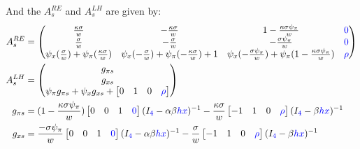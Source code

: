\documentclass[11pt]{article}
\renewcommand{\[}{\begin{equation}}
\renewcommand{\]}{\end{equation}}
\begin{document}
And the $A^{RE}_s$ and $A^{LH}_s$ are given by:
\begin{align}
A_s^{RE} &= \begin{pmatrix}   \frac{\kappa\sigma}{w}  &-\frac{\kappa\sigma}{w}  & 1-\frac{\kappa\sigma\psi_{\pi}}{w} & \textcolor{blue}{0}\\
 \frac{ \sigma}{w} &  -\frac{\sigma}{w} & -\frac{\sigma\psi_{\pi}}{w} & \textcolor{blue}{0}\\ 
 \psi_x( \frac{\sigma}{w}) + \psi_{\pi}( \frac{\kappa\sigma}{w}) & \psi_x(- \frac{\sigma}{w}) + \psi_{\pi}(- \frac{\kappa\sigma}{w}) +1 &  \psi_x(-\frac{\sigma\psi_{\pi}}{w}) + \psi_{\pi}( 1-\frac{\kappa\sigma\psi_{\pi}}{w}) & \textcolor{blue}{\rho}\end{pmatrix}  
\\
 A_s^{LH} & = \begin{pmatrix} g_{\pi s} \\ g_{x s} \\ \psi_{\pi}g_{\pi s} + \psi_xg_{x s} + \begin{bmatrix} 0 & 1& 0 & \textcolor{blue}{\rho}\end{bmatrix}
\end{pmatrix} \\
g_{\pi s} & = (1-\frac{\kappa\sigma\psi_{\pi}}{w} )\begin{bmatrix} 0&0&1 & \textcolor{blue}{0}\end{bmatrix} (I_{\textcolor{blue}{4}} - \alpha\beta \textcolor{blue}{hx})^{-1} -\frac{\kappa\sigma}{w}\begin{bmatrix} -1&1&0 & \textcolor{blue}{\rho} \end{bmatrix} (I_{\textcolor{blue}{4}} -\beta \textcolor{blue}{hx})^{-1}\\
g_{x s} & =  \frac{-\sigma\psi_{\pi}}{w} \begin{bmatrix} 0&0&1& \textcolor{blue}{0} \end{bmatrix}(I_{\textcolor{blue}{4}} - \alpha\beta \textcolor{blue}{hx})^{-1}  -\frac{\sigma}{w}\begin{bmatrix} -1&1&0 & \textcolor{blue}{\rho}\end{bmatrix}(I_{\textcolor{blue}{4}} -\beta \textcolor{blue}{hx})^{-1}
\end{align}

\clearpage
\end{document}
